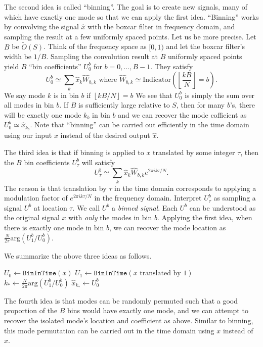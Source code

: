\documentclass[10pt]{article}
\begin{document}
The second idea is called ``binning''. The goal is to create new signals, many of which have exactly one mode so that we can apply the first idea. ``Binning'' works by convolving the signal $\hat{x}$ with the boxcar filter in frequency domain, and sampling the result at a few uniformly spaced points. Let us be more precise. Let $B$ be $\tilde{O}(S)$. Think of the frequency space as $[0,1)$ and let the boxcar filter's width be $1/B$. Sampling the convolution result at $B$ uniformly spaced points yield $B$ ``bin coefficients'' $U^b_0$ for $b=0,\ldots,B-1$. They satisfy
$$U^b_0 \simeq \sum_k \hat{x}_k \hat{W}_{b,k} \text{ where } \hat{W}_{b,k} \simeq \text{Indicator}\left(\left\lfloor \frac{kB}{N} \right\rfloor = b\right).$$
We say mode $k$ is in bin $b$ if $\left\lfloor kB/N \right\rfloor = b$ We see that $U^b_0$ is simply the sum over all modes in bin $b$. If $B$ is sufficiently large relative to $S$, then for many $b$'s, there will be exactly one mode $k_b$ in bin $b$ and we can recover the mode cofficient as $U^b_0 \simeq \hat{x}_{k_b}$. Note that ``binning'' can be carried out efficiently in the time domain using our input $x$ instead of the desired output $\hat{x}$.

The third idea is that if binning is applied to $x$ translated by some integer $\tau$, then the $B$ bin coefficients $U^b_{\tau}$ will satisfy
$$U^b_{\tau} \simeq \sum_k \hat{x}_k \hat{W}_{b,k} e^{2\pi i k \tau/N}.$$
The reason is that translation by $\tau$ in the time domain corresponds to applying a modulation factor of $e^{2\pi i k \tau/N}$ in the frequency domain. Interpret $U^b_{\tau}$ as sampling a signal $U^b$ at location $\tau$. We call $U^b$ a \emph{binned signal}. Each $U^b$ can be understood as the original signal $x$ with \emph{only} the modes in bin $b$. Applying the first idea, when there is exactly one mode in bin $b$, we can recover the mode location as $\frac{N}{2\pi} \text{arg}(U^b_1/U^b_0)$.

We summarize the above three ideas as follows.

\begin{algorithmic}[1]
\State $U_0 \leftarrow \texttt{BinInTime}(x)$
\State $U_1 \leftarrow \texttt{BinInTime}(x \text{ translated by } 1)$
		\State $k_* \leftarrow \frac{N}{2\pi} \text{arg}(U^b_1/U^b_0)$
		\State $\hat{x}_{k_*} \leftarrow U^b_0$
	\EndIf
\EndFor
\end{algorithmic}

The fourth idea is that modes can be randomly permuted such that a good proportion of the $B$ bins would have exactly one mode, and we can attempt to recover the isolated mode's location and coefficient as above. Similar to binning, this mode permutation can be carried out in the time domain using $x$ instead of $\hat{x}$.
\end{document}
